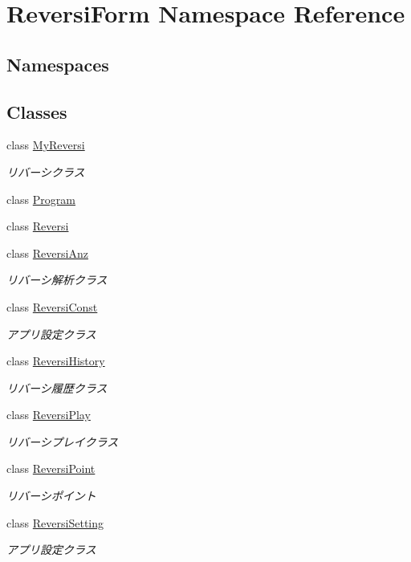 \hypertarget{namespace_reversi_form}{}\section{Reversi\+Form Namespace Reference}
\label{namespace_reversi_form}
\subsection*{Namespaces}
\begin{DoxyCompactItemize}
\end{DoxyCompactItemize}
\subsection*{Classes}
\begin{DoxyCompactItemize}
\item 
class \hyperlink{class_reversi_form_1_1_my_reversi}{My\+Reversi}
\begin{DoxyCompactList}\small\item\em リバーシクラス \end{DoxyCompactList}\item 
class \hyperlink{class_reversi_form_1_1_program}{Program}
\item 
class \hyperlink{class_reversi_form_1_1_reversi}{Reversi}
\item 
class \hyperlink{class_reversi_form_1_1_reversi_anz}{Reversi\+Anz}
\begin{DoxyCompactList}\small\item\em リバーシ解析クラス \end{DoxyCompactList}\item 
class \hyperlink{class_reversi_form_1_1_reversi_const}{Reversi\+Const}
\begin{DoxyCompactList}\small\item\em アプリ設定クラス \end{DoxyCompactList}\item 
class \hyperlink{class_reversi_form_1_1_reversi_history}{Reversi\+History}
\begin{DoxyCompactList}\small\item\em リバーシ履歴クラス \end{DoxyCompactList}\item 
class \hyperlink{class_reversi_form_1_1_reversi_play}{Reversi\+Play}
\begin{DoxyCompactList}\small\item\em リバーシプレイクラス \end{DoxyCompactList}\item 
class \hyperlink{class_reversi_form_1_1_reversi_point}{Reversi\+Point}
\begin{DoxyCompactList}\small\item\em リバーシポイント \end{DoxyCompactList}\item 
class \hyperlink{class_reversi_form_1_1_reversi_setting}{Reversi\+Setting}
\begin{DoxyCompactList}\small\item\em アプリ設定クラス \end{DoxyCompactList}\end{DoxyCompactItemize}
